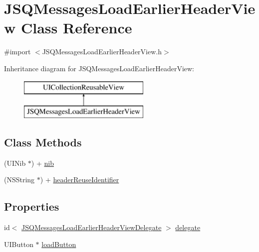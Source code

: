 \hypertarget{interface_j_s_q_messages_load_earlier_header_view}{}\section{J\+S\+Q\+Messages\+Load\+Earlier\+Header\+View Class Reference}
\label{interface_j_s_q_messages_load_earlier_header_view}


{\ttfamily \#import $<$J\+S\+Q\+Messages\+Load\+Earlier\+Header\+View.\+h$>$}

Inheritance diagram for J\+S\+Q\+Messages\+Load\+Earlier\+Header\+View\+:\begin{figure}[H]
\begin{center}
\leavevmode
\includegraphics[height=2.000000cm]{interface_j_s_q_messages_load_earlier_header_view}
\end{center}
\end{figure}
\subsection*{Class Methods}
\begin{DoxyCompactItemize}
\item 
(U\+I\+Nib $\ast$) + \hyperlink{interface_j_s_q_messages_load_earlier_header_view_a42fceb5c18e21ee73dd50146bc9009e5}{nib}
\item 
(N\+S\+String $\ast$) + \hyperlink{interface_j_s_q_messages_load_earlier_header_view_a627ba0c675b9e677ea657748118242fa}{header\+Reuse\+Identifier}
\end{DoxyCompactItemize}
\subsection*{Properties}
\begin{DoxyCompactItemize}
\item 
id$<$ \hyperlink{protocol_j_s_q_messages_load_earlier_header_view_delegate-p}{J\+S\+Q\+Messages\+Load\+Earlier\+Header\+View\+Delegate} $>$ \hyperlink{interface_j_s_q_messages_load_earlier_header_view_a4095ce0524c0badf3f2b2e8323df8824}{delegate}
\item 
U\+I\+Button $\ast$ \hyperlink{interface_j_s_q_messages_load_earlier_header_view_aaffe7fd60c12209886809afa39c3f7dc}{load\+Button}
\end{DoxyCompactItemize}


